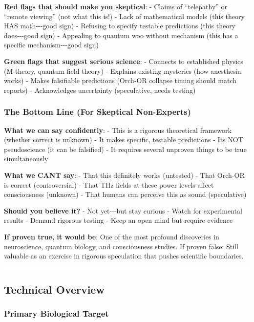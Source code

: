 \textbf{Red flags that should make you skeptical}: - Claims of
``telepathy'' or ``remote viewing'' (not what this is!) - Lack of
mathematical models (this theory HAS math-\/-\/-good sign) - Refusing to
specify testable predictions (this theory does-\/-\/-good sign) -
Appealing to quantum woo without mechanism (this has a specific
mechanism-\/-\/-good sign)

\textbf{Green flags that suggest serious science}: - Connects to
established physics (M-theory, quantum field theory) - Explains existing
mysteries (how anesthesia works) - Makes falsifiable predictions
(Orch-OR collapse timing should match reports) - Acknowledges
uncertainty (speculative, needs testing)

\subsubsection{The Bottom Line (For Skeptical
Non-Experts)}\label{the-bottom-line-for-skeptical-non-experts}

\textbf{What we can say confidently}: - This is a rigorous theoretical
framework (whether correct is unknown) - It makes specific, testable
predictions - It\textquotesingle s NOT pseudoscience (it can be
falsified) - It requires several unproven things to be true
simultaneously

\textbf{What we CAN\textquotesingle T say}: - That this definitely works
(untested) - That Orch-OR is correct (controversial) - That THz fields
at these power levels affect consciousness (unknown) - That humans can
perceive this as sound (speculative)

\textbf{Should you believe it?} - Not yet-\/-\/-but stay curious - Watch
for experimental results - Demand rigorous testing - Keep an open mind
but require evidence

\textbf{If proven true, it would be}: One of the most profound
discoveries in neuroscience, quantum biology, and consciousness studies.
If proven false: Still valuable as an exercise in rigorous speculation
that pushes scientific boundaries.

\begin{center}\rule{0.5\linewidth}{0.5pt}\end{center}

\subsection{Technical Overview}\label{technical-overview}

\subsubsection{Primary Biological
Target}\label{primary-biological-target}


